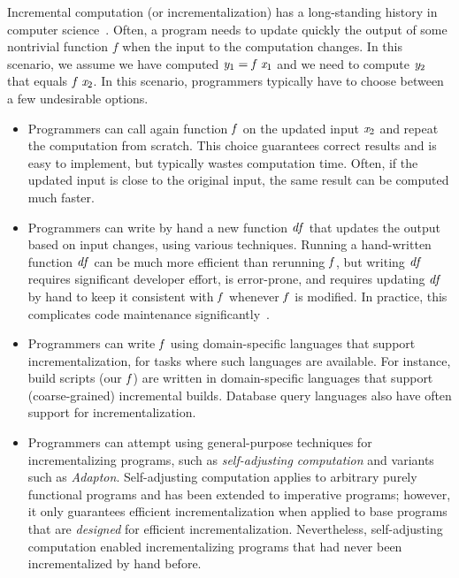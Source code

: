 Incremental computation (or incrementalization) has a long-standing history in
computer science~\citep{Ramalingam93}.
Often, a program needs to update quickly the output of some nontrivial function $f$
when the input to the computation changes. In this scenario, we assume we have
computed \ensuremath{\Varid{y}_{1}\mathrel{=}\Varid{f}\;\Varid{x}_{1}} and we need to compute \ensuremath{\Varid{y}_{2}} that equals \ensuremath{\Varid{f}\;\Varid{x}_{2}}.
In this scenario, programmers typically have to choose between a few undesirable
options.
\begin{itemize}
\item Programmers can call again function \ensuremath{\Varid{f}} on the updated input \ensuremath{\Varid{x}_{2}} and
  repeat the computation from scratch. This choice guarantees
  correct results and is easy to implement, but typically wastes
  computation time. Often, if the updated input is close to the
  original input, the same result can be computed much faster.
\item Programmers can write by hand a new function \ensuremath{\Varid{df}} that updates the
  output based on input changes, using various techniques.
  Running a hand-written function \ensuremath{\Varid{df}} can be much more efficient than rerunning
  \ensuremath{\Varid{f}}, but writing \ensuremath{\Varid{df}} requires significant developer effort, is
  error-prone, and requires updating \ensuremath{\Varid{df}} by hand to keep it consistent with \ensuremath{\Varid{f}}
  whenever \ensuremath{\Varid{f}} is modified. In practice, this complicates code maintenance
  significantly~\citep{Salvaneschi13reactive}.
\item Programmers can write \ensuremath{\Varid{f}} using domain-specific languages that
  support incrementalization, for tasks where such languages are
  available. For instance, build scripts (our \ensuremath{\Varid{f}}) are written in
  domain-specific languages that support (coarse-grained)
  incremental builds. Database query languages also have often
  support for incrementalization.
\item Programmers can attempt using general-purpose techniques for
  incrementalizing programs, such as \emph{self-adjusting
    computation} and variants such as \emph{Adapton}. Self-adjusting
  computation applies to arbitrary purely functional programs and
  has been extended to imperative programs; however, it only
  guarantees efficient incrementalization when applied to base
  programs that are \emph{designed} for efficient
  incrementalization.
  Nevertheless, self-adjusting computation enabled incrementalizing programs
  that had never been incrementalized by hand before.
\end{itemize}



